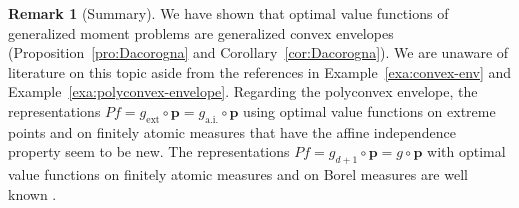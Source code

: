 \documentclass[a4paper,11pt,reqno]{amsart}
\numberwithin{equation}{section}
\theoremstyle{plain}
\theoremstyle{definition}
\newtheorem{remark}[theorem]{Remark}
\newcommand{\bp}{\mathbf{p}}
\newcommand\ait{\mathrm{a.i.}}
\newcommand\extt{\mathrm{ext}}
\begin{document}
%
\begin{remark}[Summary]\label{rem:envelopes}
We have shown that optimal value functions of generalized moment problems are generalized 
convex envelopes (Proposition~\ref{pro:Dacorogna} and Corollary~\ref{cor:Dacorogna}). We 
are unaware of literature on this topic aside from the references in 
Example~\ref{exa:convex-env} and Example~\ref{exa:polyconvex-envelope}. Regarding the 
polyconvex envelope, the representations $P f=g_\extt\circ\bp=g_\ait\circ\bp$ using optimal 
value functions on extreme points and on finitely atomic measures that have the affine 
independence property seem to be new. The representations $P f=g_{d+1}\circ\bp=g\circ\bp$ 
with optimal value functions on finitely atomic measures and on Borel measures are well 
known \cite{dacorogna08,fantuzzi-etal26}.
\end{remark}
%
%
\end{document}
